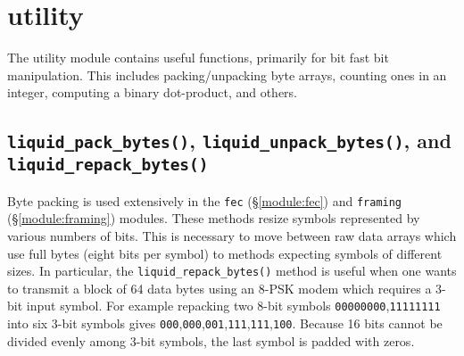 % 
%

\newpage
\section{utility}
\label{module:utility}
The utility module contains useful functions, primarily for bit fast bit
manipulation.
This includes packing/unpacking byte arrays, counting ones in an integer,
computing a binary dot-product, and others.

\subsection{{\tt liquid\_pack\_bytes()},
            {\tt liquid\_unpack\_bytes()}, and
            {\tt liquid\_repack\_bytes()}}
\label{module:utility:pack_bytes}
Byte packing is used extensively in the
{\tt fec} (\S\ref{module:fec}) and
{\tt framing} (\S\ref{module:framing}) modules.
These methods resize symbols represented by various numbers of bits.
This is necessary to move between raw data arrays which use full bytes (eight
bits per symbol) to methods expecting symbols of different sizes.
In particular, the {\tt liquid\_repack\_bytes()} method is useful when one wants
to transmit a block of 64 data bytes using an 8-PSK modem which requires a
3-bit input symbol.
For example repacking two 8-bit symbols {\tt 00000000},{\tt 11111111} into six
3-bit symbols gives
{\tt 000},{\tt 000},{\tt 001},{\tt 111},{\tt 111},{\tt 100}.
Because 16 bits cannot be divided evenly among 3-bit symbols, the last symbol
is padded with zeros.

